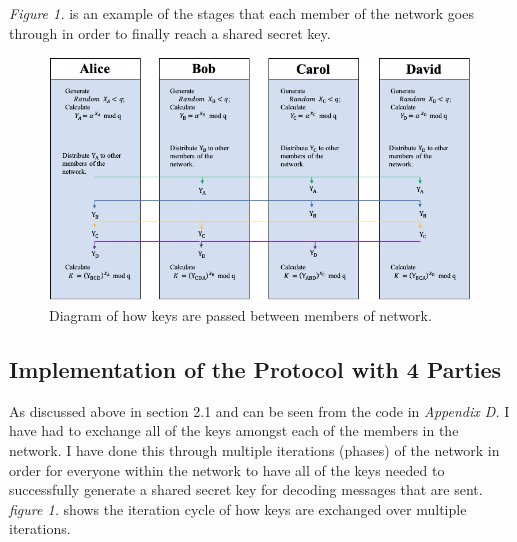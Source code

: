 \documentclass[a4paper, twoside, 11pt]{article}
\begin{document}
\textit{Figure 1.} is an example of the stages that each member of the network goes through in order to finally reach a shared secret key. 

\begin{figure}[H]
	\centering
	\includegraphics[scale=0.6]{Images/exchangeDiagram.png}
  \caption{Diagram of how keys are passed between members of network.}
\end{figure}
\subsection{Implementation of the Protocol with 4 Parties}
As discussed above in section 2.1 and can be seen from the code in \textit{Appendix D. } I have had to exchange all of the keys amongst each of the members in the network. I have done this through multiple iterations (phases) of the network in order
for everyone within the network to have all of the keys needed to successfully generate a shared secret key for decoding messages that are sent. 
\textit{figure 1.} shows the iteration cycle of how keys are exchanged over multiple iterations.
\end{document}
